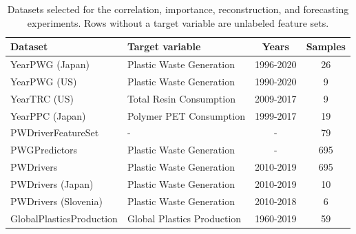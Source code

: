 \begin{table}[ht]
	\caption{
		\centering
		Datasets selected for the correlation, importance, reconstruction, and forecasting experiments. Rows without a target variable are unlabeled feature sets.
	}
	\begin{tabular}{p{4cm} p{5cm} c c}
		\toprule
		\textbf{Dataset}         & \textbf{Target variable}   & \textbf{Years} & \textbf{Samples} \\
		\midrule
		YearPWG (Japan)          & Plastic Waste Generation   & 1996-2020      & 26               \\
		YearPWG (US)             & Plastic Waste Generation   & 1990-2020      & 9                \\
		YearTRC (US)             & Total Resin Consumption    & 2009-2017      & 9                \\
		YearPPC (Japan)          & Polymer PET Consumption    & 1999-2017      & 19               \\
		PWDriverFeatureSet       & -                          & -              & 79               \\
		PWGPredictors            & Plastic Waste Generation   & -              & 695              \\
		PWDrivers                & Plastic Waste Generation   & 2010-2019      & 695              \\
		PWDrivers (Japan)        & Plastic Waste Generation   & 2010-2019      & 10               \\
		PWDrivers (Slovenia)     & Plastic Waste Generation   & 2010-2018      & 6                \\
		GlobalPlasticsProduction & Global Plastics Production & 1960-2019      & 59               \\
		\bottomrule
	\end{tabular}
	\label{tab:datasets}
\end{table}
